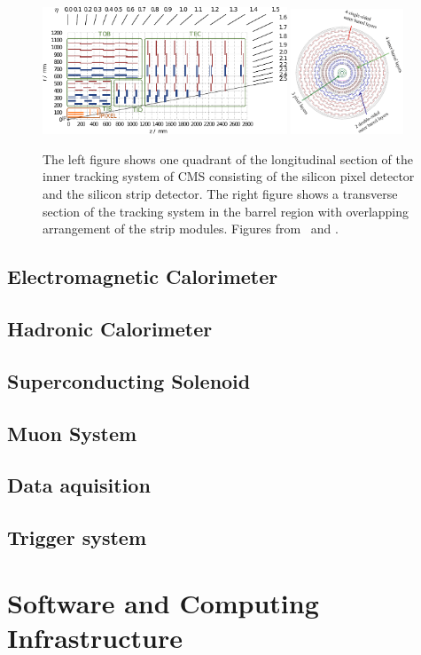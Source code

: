 \begin{figure}[htb]
    \centering
    \includegraphics[width=0.65\textwidth]{figures/cms_detector/tracker.pdf}\hfill
    \includegraphics[width=0.3\textwidth]{figures/cms_detector/tracking_sytem_barrel_slice.png}
    \caption[Inner Tracking System]{The left figure shows one quadrant of the
    longitudinal section of the inner tracking system of CMS consisting of the
silicon pixel detector and the silicon strip detector. The right figure shows a
transverse section of the tracking system in the barrel region with overlapping
arrangement of the strip modules. Figures from~\cite{phd:joramberger} and
\cite{cmsweb:innertracker}.}
        \label{fig:cms:inner_tracking}
\end{figure}

\subsection{Electromagnetic Calorimeter}
\subsection{Hadronic Calorimeter}
\subsection{Superconducting Solenoid}
\subsection{Muon System}

\subsection{Data aquisition}

\subsection{Trigger system}

\section{Software and Computing Infrastructure}


